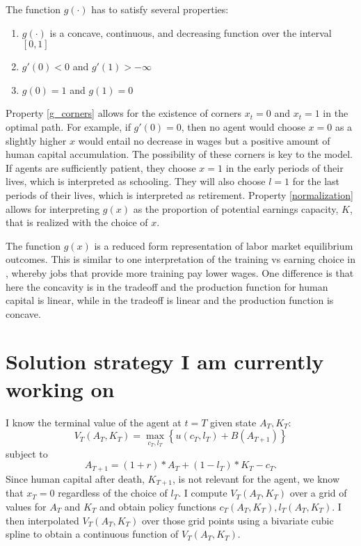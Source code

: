 \documentclass[12pt]{article}
\begin{document}
The function $g(\cdot)$ has to satisfy several properties:
\begin{enumerate}
    \item $g(\cdot)$ is a concave, continuous, and decreasing function over the interval $[0,1]$ \label{labor_market_eqm}
    \item $g'(0) < 0$ and $g'(1) > -\infty$ \label{g_corners}
    \item $g(0) = 1$ and $g(1) = 0$ \label{normalization}
\end{enumerate}
Property \ref{g_corners} allows for the existence of corners $x_t = 0$ and $x_t = 1$ in the optimal path.
For example, if $g'(0) = 0$, then no agent would choose $x = 0$ as a slightly higher $x$ would entail no decrease in wages but a positive amount of human capital accumulation. 
The possibility of these corners is key to the model. If agents are sufficiently patient, they choose $x = 1$ in the early periods of their lives, which is interpreted as schooling.
They will also choose $l = 1$ for the last periods of their lives, which is interpreted as retirement.
Property \ref{normalization} allows for interpreting $g(x)$ as the proportion of potential earnings capacity, $K$, that is realized with the choice of $x$.

The function $g(x)$ is a reduced form representation of labor market equilibrium outcomes. This is similar to one interpretation of the training vs earning choice in \textcite{ben-porath_1976_human_capital_lifecycle_earnings}, whereby jobs that provide more training pay lower wages. One difference is that here the concavity is in the tradeoff and the production function for human capital is linear, while in \textcite{ben-porath_1976_human_capital_lifecycle_earnings} the tradeoff is linear and the production function is concave.

\section{Solution strategy I am currently working on}
I know the terminal value of the agent at $t = T$ given state $A_T, K_T$:
\begin{equation}
    V_T(A_T, K_T) = \max_{c_T, l_T} \left\{ u(c_T, l_T) + B(A_{T+1}) \right\}
\end{equation}
subject to
\begin{equation}
    A_{T+1} = (1+r)*A_{T} + (1-l_{T})*K_{T} - c_{T}.
\end{equation}
Since human capital after death, $K_{T+1}$, is not relevant for the agent, we know that $x_T = 0$ regardless of the choice of $l_T$.
I compute $V_T(A_T, K_T)$ over a grid of values for $A_T$ and $K_T$ and obtain policy functions $c_T(A_T, K_T), l_T(A_T, K_T)$.
I then interpolated $V_T(A_T, K_T)$ over those grid points using a bivariate cubic spline to obtain a continuous function of $V_T(A_T, K_T)$.
\end{document}
